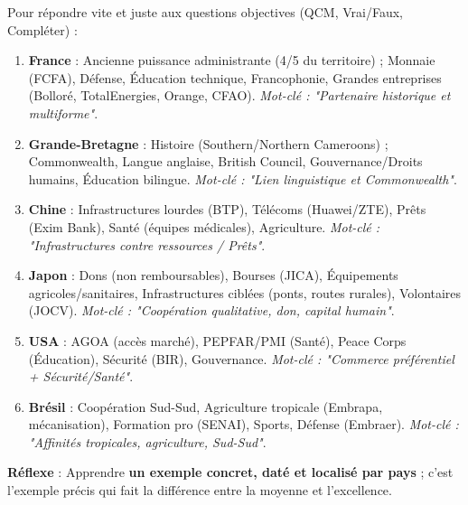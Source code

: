 \documentclass[11pt]{article}
\newcommand{\cle}[1]{{\popxbold\color{popdark}#1}}
\begin{document}
\begin{methode}
Pour répondre vite et juste aux questions objectives (QCM, Vrai/Faux, Compléter) :
\begin{enumerate}
\item \textbf{France} : Ancienne puissance administrante (4/5 du territoire) ; Monnaie (FCFA), Défense, Éducation technique, Francophonie, Grandes entreprises (Bolloré, TotalEnergies, Orange, CFAO). \textit{Mot-clé : "Partenaire historique et multiforme"}.
\item \textbf{Grande-Bretagne} : Histoire (Southern/Northern Cameroons) ; Commonwealth, Langue anglaise, British Council, Gouvernance/Droits humains, Éducation bilingue. \textit{Mot-clé : "Lien linguistique et Commonwealth"}.
\item \textbf{Chine} : Infrastructures lourdes (BTP), Télécoms (Huawei/ZTE), Prêts (Exim Bank), Santé (équipes médicales), Agriculture. \textit{Mot-clé : "Infrastructures contre ressources / Prêts"}.
\item \textbf{Japon} : \cle{Dons} (non remboursables), \cle{Bourses} (JICA), Équipements agricoles/sanitaires, Infrastructures ciblées (ponts, routes rurales), Volontaires (JOCV). \textit{Mot-clé : "Coopération qualitative, don, capital humain"}.
\item \textbf{USA} : \cle{AGOA} (accès marché), \cle{PEPFAR/PMI} (Santé), \cle{Peace Corps} (Éducation), Sécurité (BIR), Gouvernance. \textit{Mot-clé : "Commerce préférentiel + Sécurité/Santé"}.
\item \textbf{Brésil} : \cle{Coopération Sud-Sud}, Agriculture tropicale (Embrapa, mécanisation), Formation pro (SENAI), Sports, Défense (Embraer). \textit{Mot-clé : "Affinités tropicales, agriculture, Sud-Sud"}.
\end{enumerate}
\textbf{Réflexe} : Apprendre \textbf{un exemple concret, daté et localisé par pays} ; c'est l'exemple précis qui fait la différence entre la moyenne et l'excellence.
\end{methode}
\end{document}
